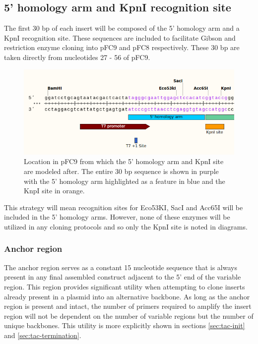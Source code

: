\documentclass[11pt]{article}
\begin{document}
\subsection{5' homology arm and KpnI recognition site}

The first 30 bp of each insert will be composed of the 5' homology arm and a KpnI recognition site. These sequences are included to facilitate Gibson and restriction enzyme cloning into pFC9 and pFC8 respectively. These 30 bp are taken directly from nucleotides 27 - 56 of pFC9.

\begin{figure}[h]
	\includegraphics[width=12cm]{images/variable_region/5_homology_arm.png}
	\centering
	\caption{Location in pFC9 from which the 5' homology arm and KpnI site are modeled after. The entire 30 bp sequence is shown in purple with the 5' homology arm highlighted as a feature in blue and the KnpI site in orange.}
	\label{fig:1}
\end{figure}

This strategy will mean recognition sites for Eco53KI, SacI and Acc65I will be included in the 5' homology arms. However, none of these enzymes will be utilized in any cloning protocols and so only the KpnI site is noted in diagrams.


\subsubsection{Anchor region}

The anchor region serves as a constant 15 nucleotide sequence that is always present in any final assembled construct adjacent to the 5' end of the variable region. This region provides significant utility when attempting to clone inserts already present in a plasmid into an alternative backbone. As long as the anchor region is present and intact, the number of primers required to amplify the insert region will not be dependent on the number of variable regions but the number of unique backbones. This utility is more explicitly shown in sections \ref{sec:tac-init} and \ref{sec:tac-termination}. 
\end{document}
